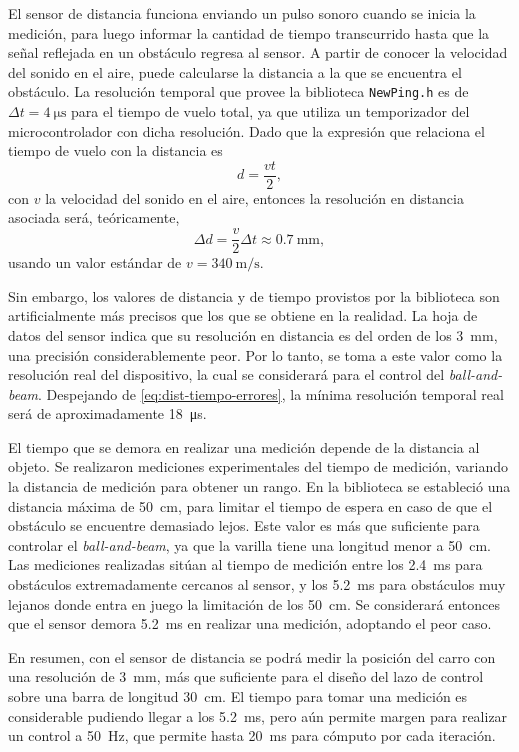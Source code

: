 El sensor de distancia funciona enviando un pulso sonoro cuando se inicia la medición, para luego informar la cantidad de tiempo transcurrido hasta que la señal reflejada en un obstáculo regresa al sensor. A partir de conocer la velocidad del sonido en el aire, puede calcularse la distancia a la que se encuentra el obstáculo. La resolución temporal que provee la biblioteca \verb|NewPing.h| es de $\Delta t = \qty{4}{\us}$ para el tiempo de vuelo total, ya que utiliza un temporizador del microcontrolador con dicha resolución. Dado que la expresión que relaciona el tiempo de vuelo con la distancia es
\begin{equation*}
    d = \frac{v t}{2},
\end{equation*}
con $v$ la velocidad del sonido en el aire, entonces la resolución en distancia asociada será, teóricamente,
\begin{equation}
    \label{eq:dist-tiempo-errores}
    \Delta d = \frac{v}{2} \Delta t \approx \qty{0.7}{\mm},
\end{equation}
usando un valor estándar de $v = \qty{340}{\m\per\s}$.

Sin embargo, los valores de distancia y de tiempo provistos por la biblioteca son artificialmente más precisos que los que se obtiene en la realidad. La hoja de datos del sensor indica que su resolución en distancia es del orden de los \qty{3}{\mm}, una precisión considerablemente peor. Por lo tanto, se toma a este valor como la resolución real del dispositivo, la cual se considerará para el control del \emph{ball-and-beam}. Despejando de \eqref{eq:dist-tiempo-errores}, la mínima resolución temporal real será de aproximadamente \qty{18}{\us}.

El tiempo que se demora en realizar una medición depende de la distancia al objeto. Se realizaron mediciones experimentales del tiempo de medición, variando la distancia de medición para obtener un rango. En la biblioteca se estableció una distancia máxima de \qty{50}{\cm}, para limitar el tiempo de espera en caso de que el obstáculo se encuentre demasiado lejos. Este valor es más que suficiente para controlar el \emph{ball-and-beam}, ya que la varilla tiene una longitud menor a \qty{50}{\cm}. Las mediciones realizadas sitúan al tiempo de medición entre los \qty{2.4}{\ms} para obstáculos extremadamente cercanos al sensor, y los \qty{5.2}{\ms} para obstáculos muy lejanos donde entra en juego la limitación de los \qty{50}{\cm}. Se considerará entonces que el sensor demora \qty{5.2}{\ms} en realizar una medición, adoptando el peor caso.

En resumen, con el sensor de distancia se podrá medir la posición del carro con una resolución de \qty{3}{\mm}, más que suficiente para el diseño del lazo de control sobre una barra de longitud \qty{30}{\cm}. El tiempo para tomar una medición es considerable pudiendo llegar a los \qty{5.2}{\ms}, pero aún permite margen para realizar un control a \qty{50}{\Hz}, que permite hasta \qty{20}{\ms} para cómputo por cada iteración.


